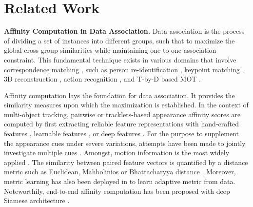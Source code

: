 \documentclass[10pt,twocolumn,letterpaper]{article}
\begin{document}
\section{Related Work}
\textbf{Affinity Computation in Data Association.} Data association is the process of dividing a set of instances into different groups, such that to maximize the global cross-group similarities while maintaining one-to-one association constraint. This fundamental technique exists in various domains that involve correspondence matching \cite{PhdThesisDA}, such as person re-identification \cite{Cvpr2018MTMC, ReIdSurvey, ReIDDA1}, keypoint matching \cite{DLGraphMatching}, 3D reconstruction \cite{PAMI3DReconShah}, action recognition \cite{DA4ActionRecog}, and T-by-D based MOT \cite{LearningByTracking}.

Affinity computation lays the foundation for data association. It provides the similarity measures upon which the maximization is established. In the context of multi-object tracking, pairwise or tracklets-based appearance affinity scores are computed by first extracting reliable feature representations with hand-crafted features \cite{HandAppr1, HandAppr2, HandAppr3, ColorApprCVPR2015, TextureAppr, BrightnessAppr, ICCV2015LocalFlow}, learnable features \cite{ApprAdaBoost, ApprMotionMIL, EnsembleTracking, LearnedApprCVPR2010, LearnedApprECCV2012, LearningToAssociate}, or deep features \cite{PAMI2018DeepApprMOT, DCNNApprFeatureNIPS2013, DeepTrackTIP2016DeepApprFeature}. For the purpose to supplement the appearance cues under severe variations, attempts have been made to jointly investigate multiple cues \cite{LearnedApprCVPR2010, HandAppr2, TwoStream1}. Amongst, motion information is the most widely applied \cite{ApprMotionMIL, DA1, TwoStream2, TwoStream3, TwoStream4, TrackingTheUntrackable}. The similarity between paired feature vectors is quantified by a distance metric such as Euclidean, Mahbolinios or Bhattacharyya distance \cite{HandMadeDistanceMetric1, MilanEnergy, OnlineMOTCVPR2014, HandAppr1, BhattacharyyaDist1, BhattacharyyaDist2}. Moreover, metric learning has also been deployed in \cite{MWIS2011, TrackingTheUntrackable, Icip2018MOTSiameseLSTM} to learn adaptive metric from data. Noteworthily, end-to-end affinity computation has been proposed with deep Siamese architecture \cite{SiameseLeCun, LearningByTracking, TripletLossTrackingEccv18, Cvpr18TwoFoldSiamese, Cvpr2018RASnet, Cvpr2018MTMC, Icip2018MOTSiameseLSTM}.
\end{document}
